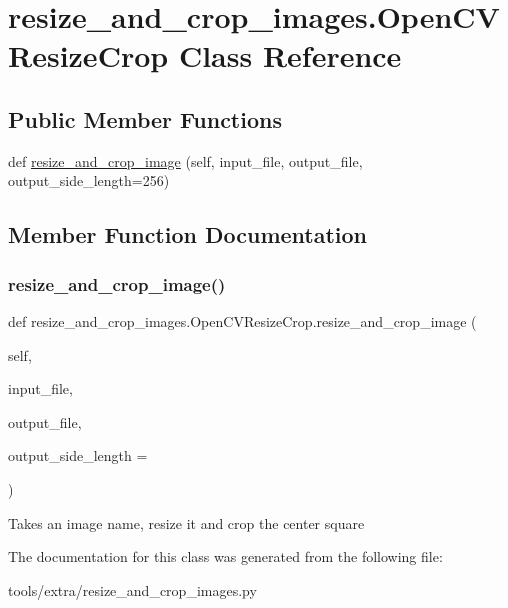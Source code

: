 \hypertarget{classresize__and__crop__images_1_1_open_c_v_resize_crop}{}\section{resize\+\_\+and\+\_\+crop\+\_\+images.\+Open\+C\+V\+Resize\+Crop Class Reference}
\label{classresize__and__crop__images_1_1_open_c_v_resize_crop}
\subsection*{Public Member Functions}
\begin{DoxyCompactItemize}
\item 
def \mbox{\hyperlink{classresize__and__crop__images_1_1_open_c_v_resize_crop_ac667df4121db2b6a25eca6942c6a504a}{resize\+\_\+and\+\_\+crop\+\_\+image}} (self, input\+\_\+file, output\+\_\+file, output\+\_\+side\+\_\+length=256)
\end{DoxyCompactItemize}


\subsection{Member Function Documentation}
\mbox{\label{classresize__and__crop__images_1_1_open_c_v_resize_crop_ac667df4121db2b6a25eca6942c6a504a}} 
\subsubsection{\texorpdfstring{resize\+\_\+and\+\_\+crop\+\_\+image()}{resize\_and\_crop\_image()}}
{\footnotesize\ttfamily def resize\+\_\+and\+\_\+crop\+\_\+images.\+Open\+C\+V\+Resize\+Crop.\+resize\+\_\+and\+\_\+crop\+\_\+image (\begin{DoxyParamCaption}\item[{}]{self,  }\item[{}]{input\+\_\+file,  }\item[{}]{output\+\_\+file,  }\item[{}]{output\+\_\+side\+\_\+length = {} }\end{DoxyParamCaption})}

\begin{DoxyVerb}Takes an image name, resize it and crop the center square
\end{DoxyVerb}
 

The documentation for this class was generated from the following file\+:\begin{DoxyCompactItemize}
\item 
tools/extra/resize\+\_\+and\+\_\+crop\+\_\+images.\+py\end{DoxyCompactItemize}
